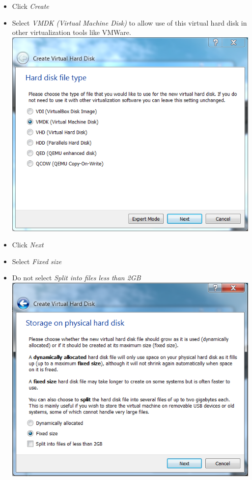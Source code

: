\begin{enumerate}[noitemsep]
\begin{itemize}
      \item Click \textit{Create}
      \item Select \textit{VMDK (Virtual Machine Disk)} to allow use of this virtual hard disk in other virtualization tools like VMWare.\\
      \includegraphics[scale=\screenshotscalefac]{Figures/VirtualBox_Create_VirtualMachine_Harddisk_File_Type}
      \item Click \textit{Next}
      \item Select \textit{Fixed size}
      \item Do not select \textit{Split into files less than 2GB}\\
      \includegraphics[scale=\screenshotscalefac]{Figures/VirtualBox_Create_VirtualMachine_Harddisk_Storage_Type}

\end{itemize}
\end{enumerate}
